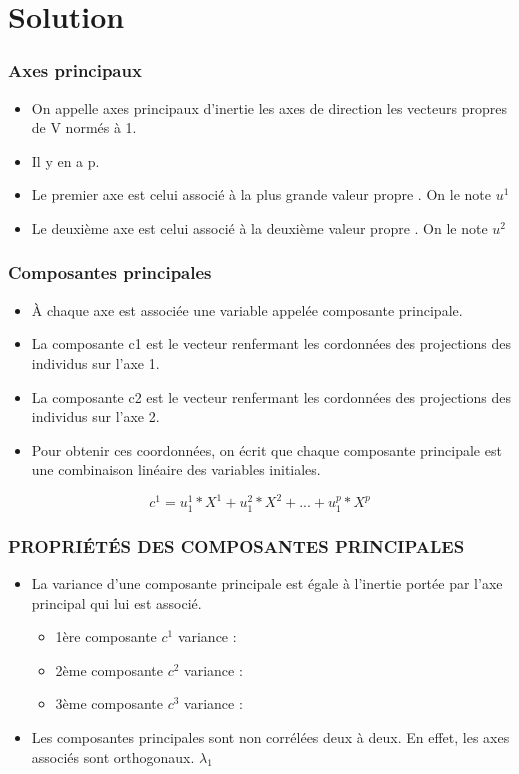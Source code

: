 \documentclass[11pt]{beamer}
\begin{document}
\section{Solution}
\begin{frame}
\frametitle{Axes principaux}
\begin{itemize}
\item On appelle axes principaux d’inertie les axes de direction
les vecteurs propres de V normés à 1.
\item Il y en a p.
\item Le premier axe est celui associé à la plus grande valeur
propre . On le note $u^1$
\item Le deuxième axe est celui associé à la deuxième valeur
propre . On le note $u^2$
\end{itemize}
\end{frame}


\begin{frame}
\frametitle{Composantes principales}
\begin{itemize}
\item À chaque axe est associée une variable appelée composante principale.
\item La composante c1 est le vecteur renfermant les cordonnées
des projections des individus sur l’axe 1.

\item La composante c2 est le vecteur renfermant les cordonnées
des projections des individus sur l’axe 2.


\item Pour obtenir ces coordonnées, on écrit que chaque
composante principale est une combinaison linéaire des
variables initiales.
\end{itemize}
$$ c^1=u_1^1*X^1+u_1^2*X^2+...+u_1^p*X^p$$
\end{frame}

\begin{frame}
\frametitle{PROPRIÉTÉS DES COMPOSANTES PRINCIPALES}
\begin{itemize}
\item La variance d’une composante principale est égale à
l’inertie portée par l’axe principal qui lui est associé.

\begin{itemize}

\item 1ère composante $c^1$ variance :
\item 2ème composante $c^2$ variance :
\item 3ème composante $c^3$ variance :

\end{itemize}
\item Les composantes principales sont non corrélées
deux à deux. En effet, les axes associés sont orthogonaux.
$\lambda_1$
\end{itemize}

\end{frame}
\end{document}
